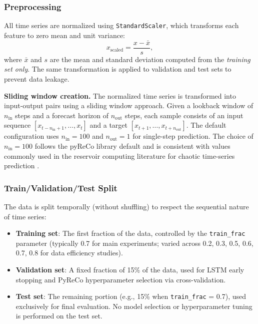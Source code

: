 \subsubsection{Preprocessing}
\label{sec:preprocessing}

All time series are normalized using \texttt{StandardScaler}, which transforms each feature to zero mean and unit variance:
\begin{equation}
    x_{\text{scaled}} = \frac{x - \bar{x}}{s},
    \label{eq:standard_scaler}
\end{equation}
where $\bar{x}$ and $s$ are the mean and standard deviation computed from the \emph{training set only}. The same transformation is applied to validation and test sets to prevent data leakage.

\textbf{Sliding window creation.} The normalized time series is transformed into input-output pairs using a sliding window approach. Given a lookback window of $n_{\text{in}}$ steps and a forecast horizon of $n_{\text{out}}$ steps, each sample consists of an input sequence $[x_{t-n_{\text{in}}+1}, \ldots, x_t]$ and a target $[x_{t+1}, \ldots, x_{t+n_{\text{out}}}]$. The default configuration uses $n_{\text{in}} = 100$ and $n_{\text{out}} = 1$ for single-step prediction. The choice of $n_{\text{in}} = 100$ follows the pyReCo library default and is consistent with values commonly used in the reservoir computing literature for chaotic time-series prediction \cite{jaeger2001echo, lukosevicius2012practical, chattopadhyay2020data, pathak2018model}.

\subsubsection{Train/Validation/Test Split}
\label{sec:split}

The data is split temporally (without shuffling) to respect the sequential nature of time series:
\begin{itemize}
    \item \textbf{Training set}: The first fraction of the data, controlled by the \texttt{train\_frac} parameter (typically 0.7 for main experiments; varied across 0.2, 0.3, 0.5, 0.6, 0.7, 0.8 for data efficiency studies).
    \item \textbf{Validation set}: A fixed fraction of 15\% of the data, used for LSTM early stopping and PyReCo hyperparameter selection via cross-validation.
    \item \textbf{Test set}: The remaining portion (e.g., 15\% when \texttt{train\_frac} = 0.7), used exclusively for final evaluation. No model selection or hyperparameter tuning is performed on the test set.
\end{itemize}

